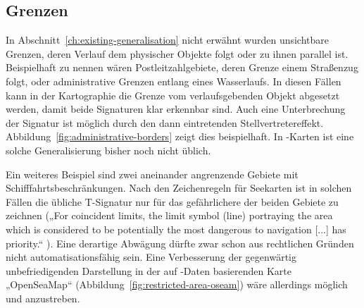 \documentclass[../main/thesis.tex]{subfiles}
\begin{document}
\subsection{Grenzen}

In Abschnitt~\ref{ch:existing-generalisation} nicht erwähnt wurden unsichtbare Grenzen, deren Verlauf dem physischer Objekte folgt oder zu ihnen parallel ist.
Beispielhaft zu nennen wären Postleitzahlgebiete, deren Grenze einem Straßenzug folgt, oder administrative Grenzen entlang eines Wasserlaufs.
In diesen Fällen kann in der Kartographie die Grenze vom verlaufsgebenden Objekt abgesetzt werden, damit beide Signaturen klar erkennbar sind.
Auch eine Unterbrechung der Signatur ist möglich durch den dann eintretenden Stellvertretereffekt. 
Abbildung~\ref{fig:administrative-borders} zeigt dies beispielhaft.
In \osm-Karten ist eine solche Generalisierung bisher noch nicht üblich.


Ein weiteres Beispiel sind zwei aneinander angrenzende Gebiete mit Schifffahrtsbeschränkungen.
Nach den Zeichenregeln für Seekarten ist in solchen Fällen die übliche T-Signatur  nur für das gefährlichere der beiden Gebiete zu zeichnen („For coincident limits, the limit symbol (line) portraying the area which is considered to be potentially the most dangerous to navigation [...] has priority.“ ).
Eine derartige Abwägung dürfte zwar schon aus rechtlichen Gründen nicht automatisationsfähig sein.
Eine Verbesserung der gegenwärtig unbefriedigenden Darstellung in der auf \osm-Daten basierenden Karte „OpenSeaMap“ (Abbildung~\ref{fig:restricted-area-oseam}) wäre allerdings möglich und anzustreben.
\end{document}
